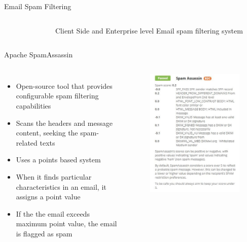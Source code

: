 \documentclass[nobackground,dvipsnames,table]{beamer}
\begin{document}
\begin{frame}{Email Spam Filtering}
\begin{columns}
\begin{figure}
            \end{figure}
            Client Side and Enterprise level Email spam filtering system
    \end{columns}
\end{frame}

\begin{frame}{Apache SpamAssassin}
    \begin{columns}
            \begin{itemize}
                \item Open-source tool that provides configurable spam filtering capabilities
                \item Scans the headers and message content, seeking the spam-related texts
                \item Uses a points based system
                \item When it finds particular characteristics in an email, it assigns a point value
                \item If the the email exceeds maximum point value, the email is flagged as spam
            \end{itemize}
            \begin{figure}
                \centering
                \includegraphics[width=\textwidth]{spam-assassin}
            \end{figure}
    \end{columns}
\end{frame}
\end{document}
